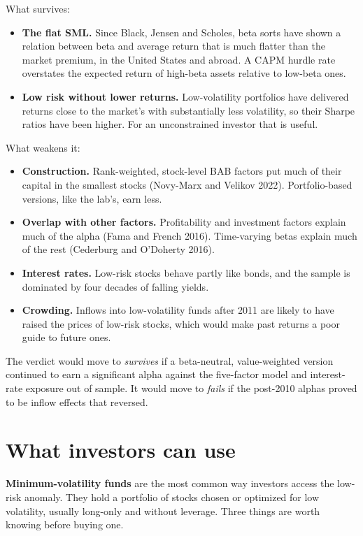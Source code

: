 What survives:

\begin{itemize}
  \item \textbf{The flat SML.} Since Black, Jensen and Scholes, beta sorts have shown a relation between beta and average return that is much flatter than the market premium, in the United States and abroad. A CAPM hurdle rate overstates the expected return of high-beta assets relative to low-beta ones.
  \item \textbf{Low risk without lower returns.} Low-volatility portfolios have delivered returns close to the market's with substantially less volatility, so their Sharpe ratios have been higher. For an unconstrained investor that is useful.
\end{itemize}

What weakens it:

\begin{itemize}
  \item \textbf{Construction.} Rank-weighted, stock-level BAB factors put much of their capital in the smallest stocks (Novy-Marx and Velikov 2022). Portfolio-based versions, like the lab's, earn less.
  \item \textbf{Overlap with other factors.} Profitability and investment factors explain much of the alpha (Fama and French 2016). Time-varying betas explain much of the rest (Cederburg and O'Doherty 2016).
  \item \textbf{Interest rates.} Low-risk stocks behave partly like bonds, and the sample is dominated by four decades of falling yields.
  \item \textbf{Crowding.} Inflows into low-volatility funds after 2011 are likely to have raised the prices of low-risk stocks, which would make past returns a poor guide to future ones.
\end{itemize}

The verdict would move to \emph{survives} if a beta-neutral, value-weighted version continued to earn a significant alpha against the five-factor model and interest-rate exposure out of sample. It would move to \emph{fails} if the post-2010 alphas proved to be inflow effects that reversed.

\section{What investors can use}
\label{sec:05-investors}

\textbf{Minimum-volatility funds} are the most common way investors access the low-risk anomaly. They hold a portfolio of stocks chosen or optimized for low volatility, usually long-only and without leverage. Three things are worth knowing before buying one.

